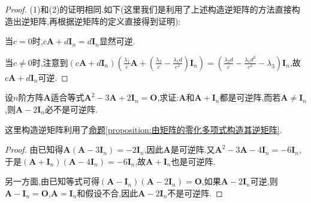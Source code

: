 \documentclass[../../main.tex]{subfiles}%
\begin{document}
\begin{proof}
(1)和(2)的证明相同.如下(这里我们是利用了上述构造逆矩阵的方法直接构造出逆矩阵,再根据逆矩阵的定义直接得到证明):

当\(c = 0\)时,\(c\boldsymbol{A}+d\boldsymbol{I}_n=d\boldsymbol{I}_n\)显然可逆.

当\(c\neq 0\)时,注意到\((c\boldsymbol{A}+d\boldsymbol{I}_n)\left(\frac{\lambda_1}{c}\boldsymbol{A}+\left(\frac{\lambda_2}{c}-\frac{\lambda_1d}{c^2}\right)\boldsymbol{I}_n\right)=\left(\frac{\lambda_2d}{c}-\frac{\lambda_1d^2}{c^2}-\lambda_3\right)\boldsymbol{I}_n\),故\(c\boldsymbol{A}+d\boldsymbol{I}_n\)可逆.
\end{proof}

\begin{example}
设\(n\)阶方阵\(\boldsymbol{A}\)适合等式\(\boldsymbol{A}^{2}-3\boldsymbol{A}+2\boldsymbol{I}_{n}=\boldsymbol{O}\),求证:\(\boldsymbol{A}\)和\(\boldsymbol{A}+\boldsymbol{I}_{n}\)都是可逆阵,而若\(\boldsymbol{A}\neq\boldsymbol{I}_{n}\),则\(\boldsymbol{A}-2\boldsymbol{I}_{n}\)必不是可逆阵.
\end{example}
\begin{note}
这里构造逆矩阵利用了\hyperref[proposition:由矩阵的零化多项式构造其逆矩阵]{命题\ref{proposition:由矩阵的零化多项式构造其逆矩阵}}.
\end{note}
\begin{proof}
由已知得\(\boldsymbol{A}(\boldsymbol{A}-3\boldsymbol{I}_{n})=-2\boldsymbol{I}_{n}\),因此\(\boldsymbol{A}\)是可逆阵.又\(\boldsymbol{A}^{2}-3\boldsymbol{A}-4\boldsymbol{I}_{n}=-6\boldsymbol{I}_{n}\),于是\((\boldsymbol{A}+\boldsymbol{I}_{n})(\boldsymbol{A}-4\boldsymbol{I}_{n})=-6\boldsymbol{I}_{n}\),故\(\boldsymbol{A}+\boldsymbol{I}_{n}\)也是可逆阵.

另一方面,由已知等式可得\((\boldsymbol{A}-\boldsymbol{I}_{n})(\boldsymbol{A}-2\boldsymbol{I}_{n})=\boldsymbol{O}\),如果\(\boldsymbol{A}-2\boldsymbol{I}_{n}\)可逆,则\(\boldsymbol{A}-\boldsymbol{I}_{n}=\boldsymbol{O}\),\(\boldsymbol{A}=\boldsymbol{I}_{n}\)和假设不合,因此\(\boldsymbol{A}-2\boldsymbol{I}_{n}\)不是可逆阵.
\end{proof}
\end{document}
